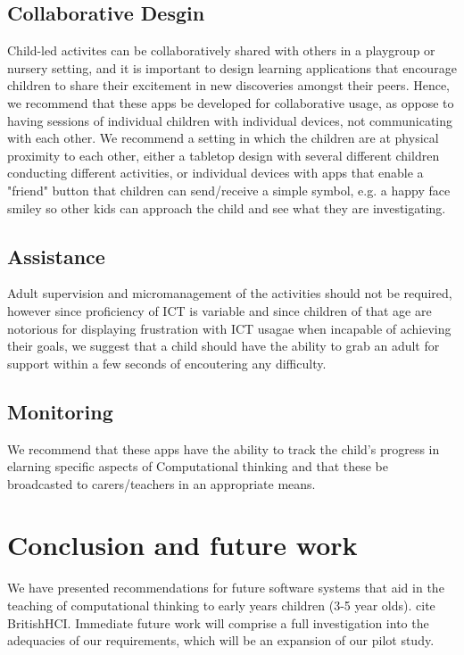 \documentclass{sig-alternate}
\begin{document}
\subsection*{Collaborative Desgin} 
Child-led activites can be collaboratively shared with others in a playgroup or nursery setting, and it is important to design learning applications that encourage children to share their excitement in new discoveries amongst their peers. Hence, we recommend that these apps be developed for collaborative usage, as oppose to having sessions of individual children with individual devices, not communicating with each other. We recommend a setting in which the children are at physical proximity to each other,  either a tabletop design with several different children conducting different activities, or individual devices with apps that enable a "friend" button that children can send/receive a simple symbol, e.g. a happy face smiley so other kids can approach the child and see what they are investigating. 
\subsection*{Assistance}
Adult supervision and micromanagement of the activities should not be required, however since proficiency of ICT is variable and since children of that age are notorious for displaying frustration with ICT  usagae when incapable of achieving their goals, we suggest that a child should have the ability to grab an adult for support within a few seconds of encoutering any difficulty.
\subsection*{Monitoring}
We recommend that these apps have the ability to track the child's progress in elarning specific aspects of Computational thinking and that these be broadcasted to carers/teachers in an appropriate means. 

\section{Conclusion and future work}
We have presented recommendations for future software systems that aid in the teaching of computational thinking to early years children (3-5 year olds).
cite BritishHCI.
Immediate future work will comprise a full investigation into the adequacies of our requirements, which will be an expansion of our pilot study.


\end{document}

